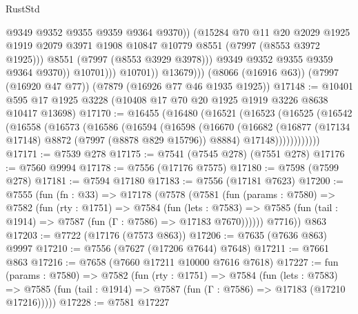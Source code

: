 \begin{lexlean}{RustStd}
\begin{coremodule}
{\begin{coremodule}
{{{{{{{{{{{{{{{{{{{{{{{{{{{{{{{{{{{{{{{{{{{                              @9349
                              @9352
                              @9355
                              @9359
                              @9364
                              @9370))
                          (@15284
                            @70
                            @11
                            @20
                            @2029
                            @1925
                            @1919
                            @2079
                            @3971
                            @1908
                            @10847
                            @10779
                            @8551
                            (@7997 (@8553 @3972 @1925)))
                          @8551
                          (@7997 (@8553 @3929 @3978)))
                        @9349
                        @9352
                        @9355
                        @9359
                        @9364
                        @9370))
                    @10701)))
              @10701))
          @13679)))
    (@8066 (@16916 @63))
    (@7997 (@16920 @47 @77))
    (@7879 (@16926 @77 @46 @1935 @1925))
@17148 := @10401 @595 @17 @1925 @3228 (@10408 @17 @70 @20 @1925 @1919 @3226 @8638 @10417 @13698)
@17170 := @16455
    (@16480
      (@16521
        (@16523
          (@16525
            (@16542
              (@16558
                (@16573
                  (@16586
                    (@16594
                      (@16598
                        (@16670
                          (@16682
                            (@16877 (@17134 @17148) @8872 (@7997 (@8878 @829 @15796)) @8884)
                            @17148))))))))))))
@17171 := @7539 @278
@17175 := @7541 (@7545 @278) (@7551 @278)
@17176 := @7560 @9994
@17178 := @7556 (@17176 @7575)
@17180 := @7598 (@7599 @278)
@17181 := @7594 @17180
@17183 := @7556 (@17181 @7623)
@17200 := @7555
    (fun (fn : @33) =>
    @17178
      (@7578
        (@7581
          (fun (params : @7580) =>
          @7582
            (fun (rty : @1751) =>
            @7584
              (fun (lets : @7583) =>
              @7585 (fun (tail : @1914) => @7587 (fun (Γ : @7586) => @17183 @7670))))))
        @7716))
    @863
@17203 := @7722 (@17176 (@7573 @863))
@17206 := @7635 (@7636 @863) @9997
@17210 := @7556 (@7627 (@17206 @7644) @7648)
@17211 := @7661 @863
@17216 := @7658 (@7660 @17211 @10000 @7616 @7618)
@17227 := fun (params : @7580) =>
  @7582
    (fun (rty : @1751) =>
    @7584
      (fun (lets : @7583) =>
      @7585 (fun (tail : @1914) => @7587 (fun (Γ : @7586) => @17183 (@17210 @17216)))))
@17228 := @7581 @17227
}}}}}}}}}}}}}}}}}}}}}}}}}}}}}}}}}}}}}}}}}}}
\end{coremodule}}
\end{coremodule}
\end{lexlean}
